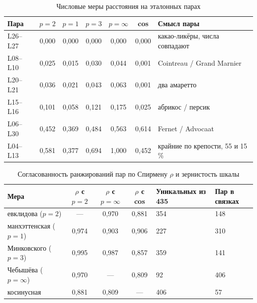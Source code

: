 \begin{table}[H]
	\centering
	\caption{Числовые меры расстояния на эталонных парах}
	\label{tab:lr2_numeric}
	\footnotesize\setlength{\tabcolsep}{4pt}
	\begin{tabular}{|L{1.6cm}|c|c|c|c|c|L{4.0cm}|}
		\hline
		Пара & $p=2$ & $p=1$ & $p=3$ & $p=\infty$ & cos & Смысл пары \\ \hline
		L26--L27 & 0,000 & 0,000 & 0,000 & 0,000 & 0,000 & какао-ликёры, числа совпадают \\ \hline
		L08--L10 & 0,025 & 0,015 & 0,030 & 0,044 & 0,001 & Cointreau / Grand Marnier \\ \hline
		L20--L21 & 0,036 & 0,021 & 0,043 & 0,063 & 0,001 & два амаретто \\ \hline
		L15--L16 & 0,101 & 0,058 & 0,121 & 0,175 & 0,025 & абрикос / персик \\ \hline
		L06--L30 & 0,452 & 0,369 & 0,484 & 0,563 & 0,614 & Fernet / Advocaat \\ \hline
		L04--L13 & 0,581 & 0,377 & 0,694 & 1,000 & 0,452 & крайние по крепости, 55 и 15 \% \\ \hline
	\end{tabular}
\end{table}

\begin{table}[H]
	\centering
	\caption{Согласованность ранжирований пар по Спирмену $\rho$ и зернистость шкалы}
	\label{tab:lr2_numeric_stats}
	\footnotesize
	\begin{tabular}{|l|c|c|c|L{2.3cm}|L{1.8cm}|}
		\hline
		Мера & $\rho$ с $p=2$ & $\rho$ с $p=\infty$ & $\rho$ с cos & Уникальных из 435 & Пар в связках \\ \hline
		евклидова ($p=2$) & --- & 0,970 & 0,881 & 354 & 148 \\ \hline
		манхэттенская ($p=1$) & 0,974 & 0,903 & 0,906 & 227 & 310 \\ \hline
		Минковского ($p=3$) & 0,995 & 0,987 & 0,857 & 359 & 141 \\ \hline
		Чебышёва ($p=\infty$) & 0,970 & --- & 0,809 & 92 & 406 \\ \hline
		косинусная & 0,881 & 0,809 & --- & 406 & 57 \\ \hline
	\end{tabular}
\end{table}

